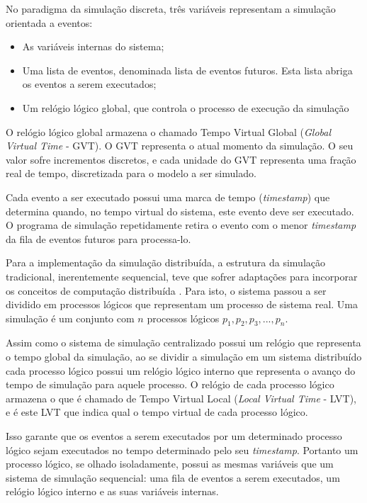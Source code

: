 No paradigma da simulação discreta, três variáveis representam a simulação orientada a eventos:

\begin{itemize}
\item As variáveis internas do sistema;
\item Uma lista de eventos, denominada lista de eventos futuros. Esta lista abriga os eventos a serem executados;
\item Um relógio lógico global, que controla o processo de execução da simulação
\end{itemize}

O relógio lógico global armazena o chamado Tempo Virtual Global (\textit{Global Virtual Time} - GVT). O GVT representa o atual momento da simulação. O seu valor sofre incrementos discretos, e cada unidade do GVT representa uma fração real de tempo, discretizada para o modelo a ser simulado.

Cada evento a ser executado possui uma marca  de tempo (\textit{timestamp}) que determina quando, no tempo virtual do sistema, este evento deve ser executado. O programa de simulação repetidamente retira o evento com o menor \textit{timestamp} da fila de eventos futuros para processa-lo.

Para a implementação da simulação distribuída, a estrutura da simulação tradicional, inerentemente sequencial, teve que sofrer adaptações para incorporar os conceitos de computação distribuída \cite{REED-MALONY}. Para isto, o sistema passou a ser dividido em processos lógicos que representam um processo de sistema real. Uma simulação é um conjunto com $n$ processos lógicos $p_{1}, p_{2}, p_{3}, ..., p_{n}$.


Assim como o sistema de simulação centralizado possui um relógio que representa o tempo global da simulação, ao se dividir a simulação em um sistema distribuído cada processo lógico possui um relógio lógico interno que representa o avanço do tempo de simulação para aquele processo. O relógio de cada processo lógico armazena o que é chamado de Tempo Virtual Local (\textit{Local Virtual Time} - LVT), e é este LVT que indica qual o tempo virtual de cada processo lógico.

Isso garante que os eventos a serem executados por um determinado processo lógico sejam executados no tempo determinado pelo seu \textit{timestamp}. Portanto um processo lógico, se olhado isoladamente, possui as mesmas variáveis que um sistema de simulação sequencial: uma fila de eventos a serem executados, um relógio lógico interno e as suas variáveis internas.

